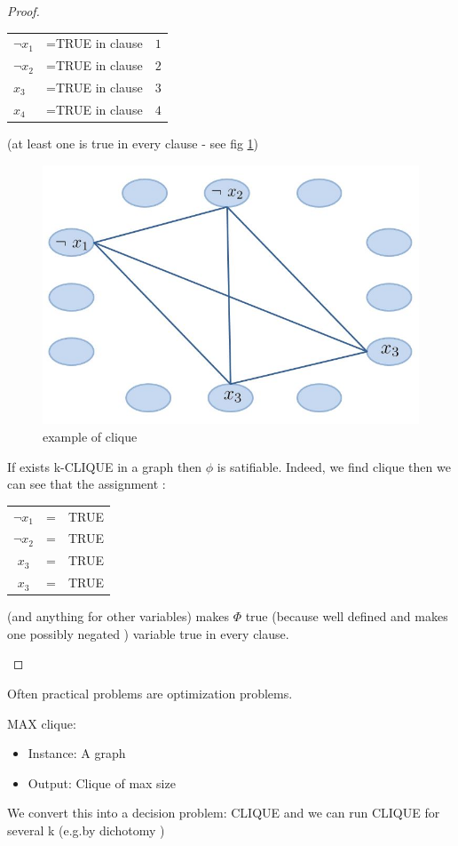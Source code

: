 \begin{proof}
\begin{itemize}
\begin{center}
\begin{tabular}{lll}
$\neg x_1$ &=TRUE in clause & $1$ \\$\neg x_2$ &=TRUE in clause & $2$ \\ $ x_3$ &=TRUE in clause & $3$ \\ $x_4$ &=TRUE in clause & $4$
\end{tabular}
\end{center}

(at least one is true in every clause - see fig \ref{c12:clique2})

\begin{figure}[h!!]
\centering
\includegraphics[scale=0.45]{images/fig_4.jpg}
\caption{example of clique}
\label{c12:clique2}
\end{figure}

If exists k-CLIQUE in a graph then $\phi$ is satifiable.
 Indeed, we find clique then we can see that the assignment : \\
 
 \begin{center}
\begin{tabular}{ccc}
$ \neg x_1$ & =& TRUE \\
$\neg x_2$ & =& TRUE \\
 $x_3$ & =& TRUE \\
 $x_3$ & =& TRUE \\
\end{tabular}
\end{center}
(and anything for other variables) makes $\Phi$ true (because well defined and makes one possibly negated ) variable true in every clause.\\
\end{itemize}
\end{proof}

Often practical problems are optimization problems.\\

\begin{definition}
MAX clique:
\begin{itemize}
\item Instance: A graph
\item Output:  Clique of max size
\end{itemize}

We convert this into a decision problem: CLIQUE and we can run CLIQUE for several k (e.g.by dichotomy )
\end{definition}